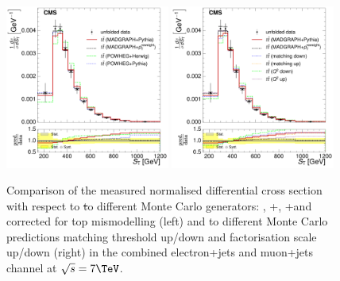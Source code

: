 \begin{figure}[hbtp]
    \centering
     \includegraphics[width=0.48\textwidth]{Chapters/04_Analysis/04b_XSections/images/results/7TeV/ST/central/normalised_xsection_combined_different_generators.pdf}\hfill
     \includegraphics[width=0.48\textwidth]{Chapters/04_Analysis/04b_XSections/images/results/7TeV/ST/central/normalised_xsection_combined_systematics_shifts.pdf}\hfill
     \caption{Comparison of the measured normalised differential cross section with respect to \st to
     different Monte Carlo generators: \MADGRAPH, \POWHEG+\HERWIG, \POWHEG+\PYTHIA and \MADGRAPH corrected for
     top \pt mismodelling (left) and to different Monte Carlo predictions matching threshold up/down and
     factorisation scale up/down (right) in the combined electron+jets and muon+jets channel at
     $\sqrt{s}=7\TeV$.}
     \label{fig:result_ST_7TeV_combined}
\end{figure}

